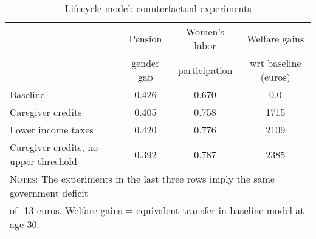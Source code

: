\begin{table}[htbp]\caption{Lifecycle model: counterfactual experiments}\label{table:experiments}\centering\footnotesize\begin{tabular}{lccc} \toprule & Pension & Women's labor & Welfare gains  \\&gender gap &participation & wrt baseline (euros)  \\\midrule    Baseline                                &0.426&0.670& 0.0\\ Caregiver credits                       &0.405&0.758& 1715\\ Lower income taxes                      &0.420&0.776& 2109\\ Caregiver credits, no upper threshold   &0.392&0.787& 2385\\  \bottomrule\multicolumn{4}{l}{\textsc{Notes:} The experiments in the last three rows imply the same government deficit}\\\multicolumn{4}{l}{of   -13 euros. Welfare gains = equivalent transfer in baseline model at age 30. }\end{tabular}
      \end{table}